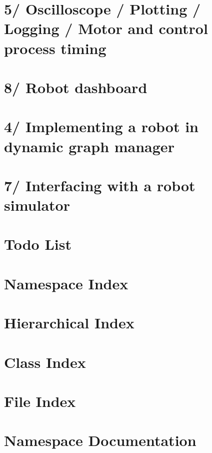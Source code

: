 \documentclass[twoside]{book}
\newcommand{\+}{\discretionary{\mbox{\scriptsize$\hookleftarrow$}}{}{}}
\begin{document}
\chapter{5/ Oscilloscope / Plotting / Logging / Motor and control process timing}
\label{subpage_plot}
\hypertarget{subpage_plot}{}

\chapter{8/ Robot dashboard}
\label{subpage_robot_dashboard}
\hypertarget{subpage_robot_dashboard}{}

\chapter{4/ Implementing a robot in dynamic graph manager}
\label{subpage_robot_properties}
\hypertarget{subpage_robot_properties}{}

\chapter{7/ Interfacing with a robot simulator}
\label{subpage_robot_simulation}
\hypertarget{subpage_robot_simulation}{}

\chapter{Todo List}
\label{todo}
\hypertarget{todo}{}

\chapter{Namespace Index}

\chapter{Hierarchical Index}

\chapter{Class Index}

\chapter{File Index}

\chapter{Namespace Documentation}














\end{document}
